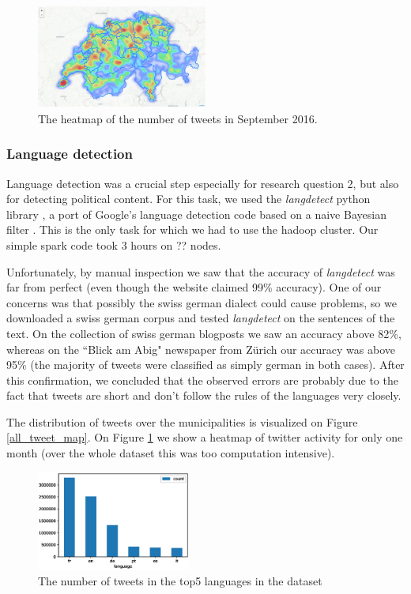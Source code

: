 \begin{figure}[h]
  \includegraphics[width=0.5\textwidth]{images/heat_map.png}
  \caption{The heatmap of the number of tweets in September 2016.}
  \label{heat_map}
\end{figure}



\subsubsection{Language detection}

Language detection was a crucial step especially for research question 2, but also for detecting political content. For this task, we used the \textit{langdetect} python library \cite{pylangdetect}, a port of Google's language detection code based on a naive Bayesian filter \cite{nakatani2010langdetect}. This is the only task for which we had to use the hadoop cluster. Our simple spark code took 3 hours on ?? nodes.

Unfortunately, by manual inspection we saw that the accuracy of \textit{langdetect} was far from perfect (even though the website claimed 99\% accuracy). One of our concerns was that possibly the swiss german dialect could cause problems, so we downloaded a swiss german corpus and tested \textit{langdetect} on the sentences of the text. On the collection of swiss german blogposts we saw an accuracy above 82\%, whereas on the ``Blick am Abig" newspaper from Z\"urich our accuracy was above 95\% (the majority of tweets were classified as simply german in both cases). After this confirmation, we concluded that the observed errors are probably due to the fact that tweets are short and don't follow the rules of the languages very closely. 

The distribution of tweets over the municipalities is visualized on Figure \ref{all_tweet_map}. On Figure \ref{heat_map} we show a heatmap of twitter activity for only one month (over the whole dataset this was too computation intensive).

\begin{figure}[h]
  \includegraphics[width=0.45\textwidth]{images/swiss_counts.eps}
  \caption{The number of tweets in the top5 languages in the dataset}
  \label{swiss_counts}
\end{figure}



